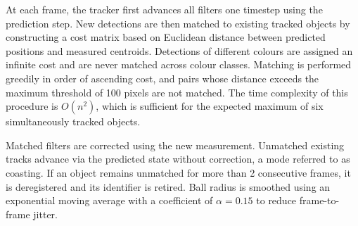 At each frame, the tracker first advances all filters one timestep using the
prediction step. New detections are then matched to existing tracked objects by
constructing a cost matrix based on Euclidean distance between predicted positions
and measured centroids. Detections of different colours are assigned an infinite
cost and are never matched across colour classes. Matching is performed greedily in
order of ascending cost, and pairs whose distance exceeds the maximum threshold of
100 pixels are not matched. The time complexity of this procedure is $O(n^2)$,
which is sufficient for the expected maximum of six simultaneously tracked objects.

Matched filters are corrected using the new measurement. Unmatched existing tracks
advance via the predicted state without correction, a mode referred to as coasting.
If an object remains unmatched for more than 2 consecutive frames, it is
deregistered and its identifier is retired. Ball radius is smoothed using an
exponential moving average with a coefficient of $\alpha = 0.15$ to reduce
frame-to-frame jitter.

